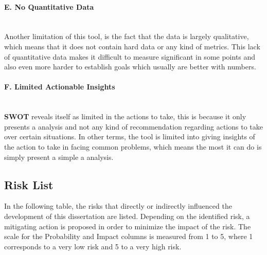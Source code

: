 \paragraph{E. No Quantitative Data}\mbox{}\\
Another limitation of this tool, is the fact that the data is largely qualitative, which means that it does not contain hard data or any kind of metrics. This lack of quantitative data makes it difficult to measure significant in some points and also even more harder to establish goals which usually are better with numbers.

\paragraph{F. Limited Actionable Insights}\mbox{}\\
\textbf{SWOT} reveals itself as limited in the actions to take, this is because it only presents a analysis and not any kind of recommendation regarding actions to take over certain situations. In other terms, the tool is limited into giving insights of the action to take in facing common problems, which means the most it can do is simply present a simple a analysis.

\subsection{Risk List}

In the following table, the risks that directly or indirectly influenced the development of this dissertation are listed. Depending on the identified risk, a mitigating action is proposed in order to minimize the impact of the risk. The scale for the Probability and Impact columns is measured from 1 to 5, where 1 corresponds to a very low risk and 5 to a very high risk.

